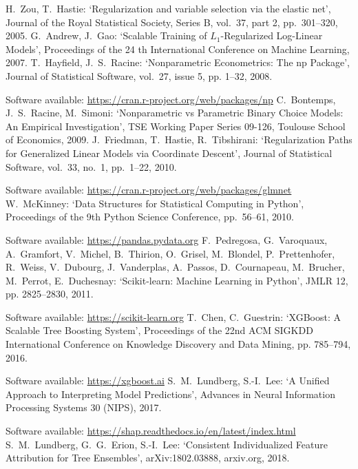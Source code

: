 \begin{thebibliography}{99}
%
H.\ Zou, T.\ Hastie: `Regularization and variable selection via the elastic net', Journal of the Royal Statistical Society, Series B, vol.\ 37, part 2, pp.\ 301--320, 2005.
%
G.\ Andrew, J.\ Gao: `Scalable Training of $L_1$-Regularized Log-Linear Models', Proceedings of the 24 th International Conference on Machine Learning, 2007.
%
T.\ Hayfield, J.\ S.\ Racine: `Nonparametric Econometrics: The np Package', Journal of Statistical Software, vol.\ 27, issue 5, pp. 1--32, 2008.\par
%
Software available: \url{https://cran.r-project.org/web/packages/np}
%
C.\ Bontemps, J.\ S.\ Racine, M.\ Simoni: `Nonparametric vs Parametric Binary Choice Models: An Empirical Investigation', TSE Working Paper Series 09-126, Toulouse School of Economics, 2009.
%
J.\ Friedman, T.\ Hastie, R.\ Tibshirani: `Regularization Paths for Generalized Linear Models via Coordinate Descent', Journal of Statistical Software, vol.\ 33, no.\ 1, pp.\ 1--22, 2010.\par
%
Software available: \url{https://cran.r-project.org/web/packages/glmnet}
%
W.\ McKinney: `Data Structures for Statistical Computing in Python', Proceedings of the 9th Python Science Conference, pp.\ 56--61, 2010.\par
%
Software available: \url{https://pandas.pydata.org}
%
F.\ Pedregosa, G.\ Varoquaux, A.\ Gramfort, V.\ Michel, B.\ Thirion, O.\ Grisel, M.\ Blondel, P.\ Prettenhofer, R.\ Weiss, V.\ Dubourg, J.\ Vanderplas, A.\ Passos, D.\ Cournapeau, M.\ Brucher, M.\ Perrot, E.\ Duchesnay: `Scikit-learn: Machine Learning in Python', JMLR 12, pp. 2825--2830, 2011.\par
%
Software available: \url{https://scikit-learn.org}
%
T.\ Chen, C.\ Guestrin: `XGBoost: A Scalable Tree Boosting System', Proceedings of the 22nd ACM SIGKDD International Conference on Knowledge Discovery and Data Mining, pp. 785--794, 2016.\par
%
Software available: \url{https://xgboost.ai}
%
S.\ M.\ Lundberg, S.-I.\ Lee: `A Unified Approach to Interpreting Model Predictions', Advances in Neural Information Processing Systems 30 (NIPS), 2017.\par
%
Software available: \url{https://shap.readthedocs.io/en/latest/index.html}
%
S.\ M.\ Lundberg, G.\ G.\ Erion, S.-I.\ Lee: `Consistent Individualized Feature Attribution for Tree Ensembles', arXiv:1802.03888, arxiv.org, 2018.

\end{thebibliography}

